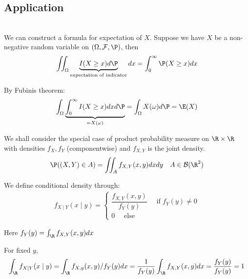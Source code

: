 \subsection{Application}\hfill\\
\noindent We can construct a formula for expectation of $X$. Suppose we have $X$ be a non-negative random variable on $(\Omega,\mathcal{F},\P)$, then
\begin{equation*}
  \begin{gathered}
    \iint_\Omega \underbrace{I(X\geq x)d\P}_{\text{expectation of indicator}}dx = \int_{0}^{\infty}\P(X\geq x)dx
  \end{gathered}
\end{equation*}\par
\noindent By Fubinis theorem:
\begin{equation*}
  \begin{gathered}
    \int_\Omega\underbrace{\int_{0}^{\infty}I(X\geq x)dxd\P}_{=X(\omega)} = \int_\Omega X(\omega)d\P = \E(X)
  \end{gathered}
\end{equation*}
\par\bigskip
\noindent We shall consider the special case of product probability measure on $\R\times\R$ with densities $f_X,f_Y$ (componentwise) and $f_{X,Y}$ is the joint density.
\begin{equation*}
  \begin{gathered}
    \P((X,Y)\in A) = \iint_Af_{X,Y}(x,y)dxdy\quad A\in\mathcal{B}(\R^2)
  \end{gathered}
\end{equation*}\par
\noindent We define conditional density through:
\begin{equation*}
  \begin{gathered}
    f_{X\mid Y}(x\mid y) = \begin{cases}\dfrac{f_{X,Y}(x,y)}{f_Y(y)}\quad\text{ if } f_Y(y)\neq0\\0\quad\text{ else}\end{cases}
  \end{gathered}
\end{equation*}\par
\noindent Here $f_Y(y) =\int_\R f_{X,Y}(x,y)dx$
\par\bigskip
\noindent For fixed $y$,
\begin{equation*}
  \begin{gathered}
    \int_\R f_{X\mid Y}(x\mid y) = \int_\R f_{X,y}(x,y)/f_Y(y)dx = \dfrac{1}{f_Y(y)}\int_\R f_{X,Y}(x,y)dx = \dfrac{f_Y(y)}{f_Y(y)} = 1
  \end{gathered}
\end{equation*}\par


